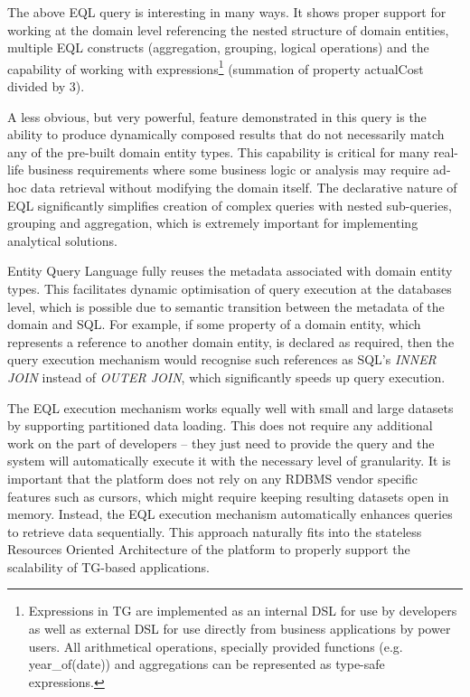   The above EQL query is interesting in many ways.
  It shows proper support for working at the domain level referencing the nested structure of domain entities, multiple EQL constructs (aggregation, grouping, logical operations) and the capability of working with expressions\footnote{
    Expressions in TG are implemented as an internal DSL for use by developers as well as external DSL for use directly from business applications by power users. 
    All arithmetical operations, specially provided functions (e.g. year\_of(date)) and aggregations can be represented as type-safe expressions.
  }
  (summation of property actualCost divided by 3).  
  
  A less obvious, but very powerful, feature demonstrated in this query is the ability to produce dynamically composed results that do not necessarily match any of the pre-built domain entity types.
  This capability is critical for many real-life business requirements where some business logic or analysis may require ad-hoc data retrieval without modifying the domain itself.
  The declarative nature of EQL significantly simplifies creation of complex queries with nested sub-queries, grouping and aggregation, which is extremely important for implementing analytical solutions.  

  Entity Query Language fully reuses the metadata associated with domain entity types.
  This facilitates dynamic optimisation of query execution at the databases level, which is possible due to semantic transition between the metadata of the domain and SQL.
  For example, if some property of a domain entity, which represents a reference to another domain entity, is declared as required, then the query execution mechanism would recognise such references as SQL's \emph{INNER JOIN} instead of \emph{OUTER JOIN}, which significantly speeds up query execution.

  The EQL execution mechanism works equally well with small and large datasets by supporting partitioned data loading.
  This does not require any additional work on the part of developers -- they just need to provide the query and the system will automatically execute it with the necessary level of granularity.
  It is important that the platform does not rely on any RDBMS vendor specific features such as cursors, which might require keeping resulting datasets open in memory.
  Instead, the EQL execution mechanism automatically enhances queries to retrieve data sequentially.
  This approach naturally fits into the stateless Resources Oriented Architecture of the platform to properly support the scalability of TG-based applications.

